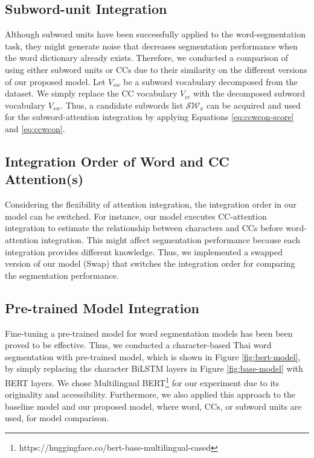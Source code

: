 \subsection{Subword-unit Integration}
Although subword units have been successfully applied to the word-segmentation task, they might generate noise that decreases segmentation performance when the word dictionary already exists.
%
Therefore, we conducted a comparison of using either subword units or CCs due to their similarity on the different versions of our proposed model. 
%
Let $V_{sw}$ be a subword vocabulary decomposed from the dataset.
%
We simply replace the CC vocabulary $V_{cc}$ with the decomposed subword vocabulary $V_{sw}$.
%
Thus, a candidate subwords list  $\mathcal{SW}_{x}$ can be acquired and used for the subword-attention integration by applying Equations \ref{eq:ccwcon-score} and \ref{eq:ccwcon}.

\subsection{Integration Order of Word and CC Attention(s)}
Considering the flexibility of attention integration, the integration order in our model can be switched.
%
For instance, our model executes CC-attention integration to estimate the relationship between characters and CCs before word-attention integration.
%
This might affect segmentation performance because each integration provides different knowledge.
%
Thus, we implemented a swapped version of our model (Swap) that switches the integration order for comparing the segmentation performance.

\subsection{Pre-trained Model Integration}
Fine-tuning a pre-trained model for word segmentation models has been been proved to be effective.
%
Thus, we conducted a character-based Thai word segmentation with pre-trained model, which is shown in Figure \ref{fig:bert-model}, by simply replacing the character BiLSTM layers in Figure \ref{fig:base-model} with BERT layers.
%
We chose Multilingual BERT\footnote{https://huggingface.co/bert-base-multilingual-cased} for our experiment due to its originality and accessibility. 
%
Furthermore, we also applied this approach to the baseline model and our proposed model, where word, CCs, or subword units are used, for model comparison.
%

